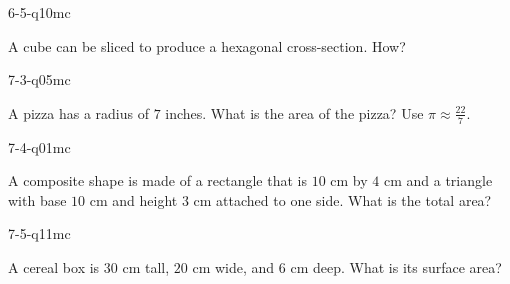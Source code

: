 \begin{practiceQuestion}{6-5-q10}{mc}
\begin{questionText}
A cube can be sliced to produce a hexagonal cross-section. How?
\end{questionText}
\end{practiceQuestion}

\begin{practiceQuestion}{7-3-q05}{mc}
\begin{questionText}
A pizza has a radius of $7$ inches. What is the area of the pizza? Use $\pi \approx \frac{22}{7}$.
\end{questionText}
\end{practiceQuestion}

\begin{practiceQuestion}{7-4-q01}{mc}
\begin{questionText}
A composite shape is made of a rectangle that is $10$ cm by $4$ cm and a triangle with base $10$ cm and height $3$ cm attached to one side. What is the total area?
\end{questionText}
\end{practiceQuestion}

\begin{practiceQuestion}{7-5-q11}{mc}
\begin{questionText}
A cereal box is $30$ cm tall, $20$ cm wide, and $6$ cm deep. What is its surface area?
\end{questionText}
\end{practiceQuestion}

